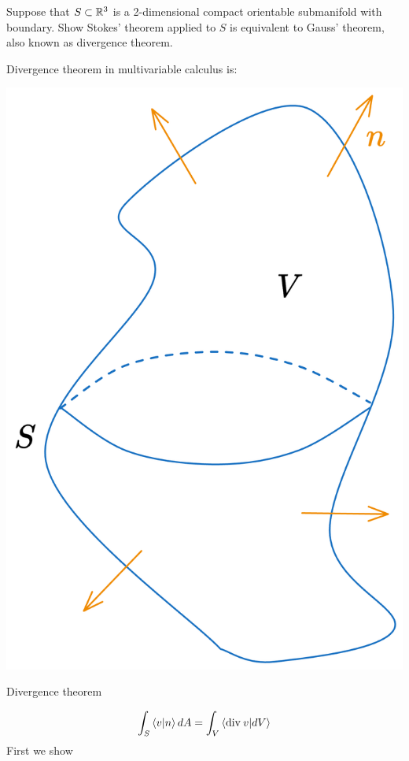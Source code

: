 \documentclass[10pt]{article}
\begin{document}
\begin{example}
	Suppose that $S \subset \mathbb{R}^3$ is a 2-dimensional compact orientable submanifold with boundary. Show Stokes' theorem applied to $S$ is equivalent to Gauss' theorem, also known as divergence theorem.
\end{example}
\sol Divergence theorem in multivariable calculus is:
\begin{marginfigure}
	\begin{center}
		\includegraphics[width=\textwidth]{figs/div.png}
	\end{center}
	\caption{Divergence theorem}
\end{marginfigure}
$$
	\int_S\ip{v}{n}dA = \int_V\ip{{\rm div }\:v}{dV}
$$
First we show
\end{document}
